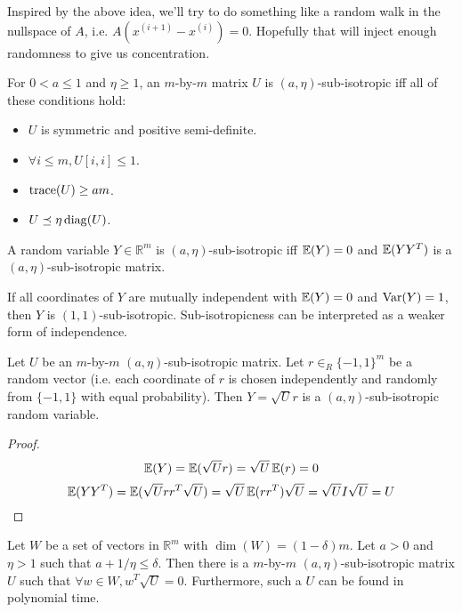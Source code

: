Inspired by the above idea, we'll try to do something like a random walk in the
nullspace of $A$, i.e. $A(x^{(i+1)} - x^{(i)}) = 0$.
Hopefully that will inject enough randomness to give us concentration.

\begin{definition}
For $0 < a \le 1$ and $\eta \ge 1$, an $m$-by-$m$ matrix $U$ is $(a, \eta)$-sub-isotropic
iff all of these conditions hold:
\begin{itemize}
\item $U$ is symmetric and positive semi-definite.
\item $\forall i \le m, U[i, i] \le 1$.
\item $\operatorname*{trace}(U) \ge am$.  %
\item $U \preceq \eta \operatorname*{diag}(U)$.  %
\end{itemize}
\end{definition}

\begin{definition}
A random variable $Y \in \mathbb{R}^m$ is $(a, \eta)$-sub-isotropic iff
$\operatorname{\mathbb{E}}(Y) = 0$ and $\operatorname{\mathbb{E}}(YY^T)$ is a $(a, \eta)$-sub-isotropic matrix.
\end{definition}
If all coordinates of $Y$ are mutually independent with $\operatorname{\mathbb{E}}(Y) = 0$ and $\operatorname*{Var}(Y) = 1$,
then $Y$ is $(1, 1)$-sub-isotropic.
Sub-isotropicness can be interpreted as a weaker form of independence.

\begin{theorem}
Let $U$ be an $m$-by-$m$ $(a, \eta)$-sub-isotropic matrix.
Let $r \in_R \{-1, 1\}^m$ be a random vector
(i.e. each coordinate of $r$ is chosen independently
and randomly from $\{-1, 1\}$ with equal probability).
Then $Y = \sqrt{U}r$ is a $(a, \eta)$-sub-isotropic random variable.
\end{theorem}
\begin{proof}
\[ \operatorname{\mathbb{E}}(Y) = \operatorname{\mathbb{E}}(\sqrt{U}r) = \sqrt{U}\operatorname{\mathbb{E}}(r) = 0 \]
\[ \operatorname{\mathbb{E}}(YY^T) = \operatorname{\mathbb{E}}(\sqrt{U}rr^T\sqrt{U}) = \sqrt{U}\operatorname{\mathbb{E}}(rr^T)\sqrt{U} = \sqrt{U}I\sqrt{U} = U \]
\end{proof}

\begin{theorem}
\label{thm:bansal-garg-17}
Let $W$ be a set of vectors in $\mathbb{R}^m$ with $\dim(W) = (1-\delta)m$.
Let $a > 0$ and $\eta > 1$ such that $a + 1/\eta \le \delta$.
Then there is a $m$-by-$m$ $(a, \eta)$-sub-isotropic matrix $U$
such that $\forall w \in W, w^T\sqrt{U} = 0$.
Furthermore, such a $U$ can be found in polynomial time.
\end{theorem}

